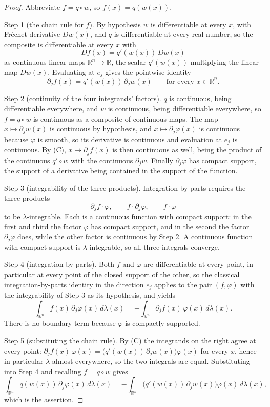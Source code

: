 \begin{proof}
Abbreviate $f = q \circ w$, so $f(x) = q(w(x))$.

Step 1 (the chain rule for $f$).  By hypothesis $w$ is differentiable at every
$x$, with Fr\'echet derivative $Dw(x)$, and $q$ is differentiable at every real
number, so the composite is differentiable at every $x$ with
\[
  Df(x) = q'(w(x))\, Dw(x)
\]
as continuous linear maps $\mathbb{R}^n \to \mathbb{R}$, the scalar
$q'(w(x))$ multiplying the linear map $Dw(x)$.  Evaluating at $e_j$ gives the
pointwise identity
\[
  \partial_j f(x) = q'(w(x))\, \partial_j w(x)
  \qquad \text{for every } x \in \mathbb{R}^n . \tag{C}
\]

Step 2 (continuity of the four integrands' factors).  $q$ is continuous, being
differentiable everywhere, and $w$ is continuous, being differentiable
everywhere, so $f = q \circ w$ is continuous as a composite of continuous maps.
The map $x \mapsto \partial_j w(x)$ is continuous by hypothesis, and
$x \mapsto \partial_j \varphi(x)$ is continuous because $\varphi$ is smooth, so
its derivative is continuous and evaluation at $e_j$ is continuous.  By (C),
$x \mapsto \partial_j f(x)$ is then continuous as well, being the product of the
continuous $q' \circ w$ with the continuous $\partial_j w$.  Finally
$\partial_j \varphi$ has compact support, the support of a derivative being
contained in the support of the function.

Step 3 (integrability of the three products).  Integration by parts requires the
three products
\[
  \partial_j f \cdot \varphi, \qquad f \cdot \partial_j \varphi, \qquad
  f \cdot \varphi
\]
to be $\lambda$-integrable.  Each is a continuous function with compact support:
in the first and third the factor $\varphi$ has compact support, and in the
second the factor $\partial_j \varphi$ does, while the other factor is
continuous by Step 2.  A continuous function with compact support is
$\lambda$-integrable, so all three integrals converge.

Step 4 (integration by parts).  Both $f$ and $\varphi$ are differentiable at
every point, in particular at every point of the closed support of the other, so
the classical integration-by-parts identity in the direction $e_j$ applies to
the pair $(f, \varphi)$ with the integrability of Step 3 as its hypothesis, and
yields
\[
  \int_{\mathbb{R}^n} f(x)\, \partial_j \varphi(x)\, d\lambda(x)
    = -\int_{\mathbb{R}^n} \partial_j f(x)\, \varphi(x)\, d\lambda(x) .
\]
There is no boundary term because $\varphi$ is compactly supported.

Step 5 (substituting the chain rule).  By (C) the integrands on the right agree
at every point:
$\partial_j f(x)\, \varphi(x)
   = \bigl(q'(w(x))\, \partial_j w(x)\bigr)\varphi(x)$ for every $x$, hence in
particular $\lambda$-almost everywhere, so the two integrals are equal.
Substituting into Step 4 and recalling $f = q \circ w$ gives
\[
  \int_{\mathbb{R}^n} q(w(x))\, \partial_j \varphi(x)\, d\lambda(x)
    = -\int_{\mathbb{R}^n}
        \bigl(q'(w(x))\, \partial_j w(x)\bigr) \varphi(x)\, d\lambda(x),
\]
which is the assertion.
\end{proof}
